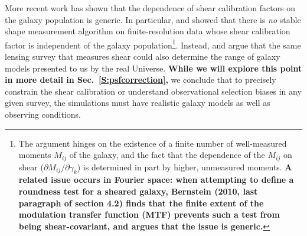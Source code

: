 \documentclass[twocolumn,useAMS,usenatbib]{mn2e}
\newcommand{\newtext}{}
\newcommand{\reftext}[1]{\textbf{#1}}
\begin{document}
\newtext{More recent work has shown that the dependence of shear calibration factors on the galaxy population is generic. In particular, 
\citet{2007MNRAS.380..229M} and \citet{2011MNRAS.414.1047Z} showed that there is {\em no} stable shape measurement algorithm on finite-resolution data whose shear calibration factor 
is independent of the galaxy population\footnote{The argument hinges on the existence of a finite number of well-measured moments $M_{ij}$ of the 
galaxy, and the fact that the dependence of the $M_{ij}$ on shear
($\partial M_{ij}/\partial\gamma_k$) is determined in part by higher,
unmeasured moments. \reftext{A related issue occurs in Fourier space:
  when attempting to define a roundness test for a sheared galaxy,
  Bernstein (2010, last paragraph of section 4.2) finds that the finite
  extent of the modulation transfer function (MTF) prevents such a test from being shear-covariant,
  and argues that the issue is generic.}}.
Instead, \citet{2010MNRAS.406.2793B} and \citet{2011MNRAS.414.1047Z} argue that the same 
lensing survey that measures shear could also determine the range of
galaxy models presented to us by the real Universe. \reftext{While we
  will explore this point in more detail in Sec.~\ref{S:psfcorrection},} we conclude that to precisely 
constrain the shear calibration or understand observational selection biases in any given survey, the simulations must have realistic galaxy models as 
well as observing conditions.}
\end{document}
